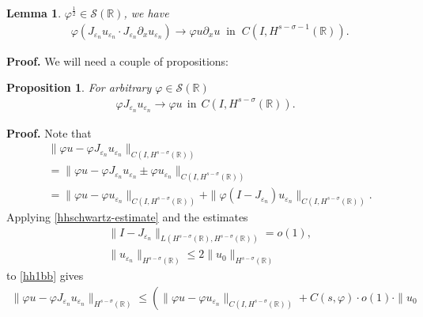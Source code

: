 \documentclass[12pt,reqno]{amsart}
\newcommand{\rr}{\mathbb{R}}
\newcommand{\ee}{\varepsilon}
\newcommand{\vp}{\varphi}
\theoremstyle{plain}  %
\newtheorem{proposition}{Proposition}
\newtheorem{lemma}{Lemma}
\theoremstyle{definition}
\begin{document}
\begin{appendices}
\begin{lemma}
			$\vp^\frac{1}{2} \in \mathcal{S}(\rr)$, we have
			\begin{equation}
				\begin{split}
					\label{hhburgers_and_nonlocal_conv}
				& \vp (J_{\varepsilon_n} u_{\varepsilon_n} 
				\cdot J_{\varepsilon_n}\partial_x u_{\varepsilon_n}) 
				\to \vp u \partial_x u \; \; 
				\text{in} \; \;
				C(I, H^{s-\sigma-1}(\rr)). 
			\end{split}
			\end{equation}
		\end{lemma}
		{\bf Proof.} We will need a couple of propositions:
		\begin{proposition}
			For arbitrary $\vp \in \mathcal{S}(\rr)$
			\label{hhprop:1aa}
			\begin{equation}
				\begin{split}
					\vp J_{\ee_n} u_{\ee_n} \to \vp u \ \ \text{in} \ \
					C(I, H^{s-\sigma}(\rr)).
					\label{hh}
				\end{split}
			\end{equation}
		\end{proposition}
			{\bf Proof.} Note that
			\begin{equation}
				\begin{split}
					& \|\vp u - \vp J_{\ee_n} u_{\ee_n}
					\|_{C(I, H^{s-\sigma}(\rr))}
					\\
					&= \|\vp u - \vp J_{\ee_n} u_{\ee_n} \pm \vp
					u_{\ee_n} \|_{C(I, H^{s-\sigma}(\rr))}
					\\
					& = \|\vp u - \vp u_{\ee_n}
					\|_{C(I, H^{s-\sigma}(\rr))} + \|\vp (I - J_{\ee_n})
					u_{\ee_n} \|_{C(I, H^{s-\sigma}(\rr))}.
					\label{hh1bb}
				\end{split}
			\end{equation}
			Applying \eqref{hhschwartz-estimate} and the estimates
			\begin{equation*}
				\begin{split}
					& \|I-J_{\ee_n} \|_{L(H^{s-\sigma}(\rr), H^{s -
					\sigma}(\rr))} = o(1),
					\\
					& \|u_{\ee_n}\|_{H^{s-\sigma}(\rr)} \le 2
					\|u_0\|_{H^{s-\sigma}(\rr)}
				\end{split}
			\end{equation*}
			to \eqref{hh1bb} gives
			\begin{equation}
				\label{hh2bb}
				\begin{split}
					\|\vp u - \vp J_{\ee_n} u_{\ee_n}\|_{H^{s-\sigma}(\rr)}
					\le \left( \|\vp u - \vp u_{\ee_n}
					\|_{C(I, H^{s-\sigma}(\rr))} + C(s, \vp) \cdot o(1) \cdot \|u_0

\end{split}
\end{equation}
\end{appendices}
\end{document}
